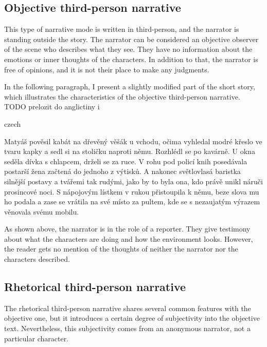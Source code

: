 \subsection{Objective third-person narrative}
This type of narrative mode is written in third-person, and the narrator is standing outside the story. The narrator can be considered an objective observer of the scene who describes what they see. They have no information about the emotions or inner thoughts of the characters. \cite{docekalova} In addition to that, the narrator is free of opinions, and it is not their place to make any judgments.

In the following paragraph, I present a slightly modified part of the short story, which illustrates the characteristics of the objective third-person narrative.
\newline
TODO prelozit do anglictiny i
\begin{otherlanguage*}{czech}
\begin{quoting}
Matyáš pověsil kabát na dřevěný věšák u vchodu, očima vyhledal modré křeslo ve tvaru kapky a sedl si na stoličku naproti němu. Rozhlédl se po kavárně. U okna seděla dívka s chlapcem, drželi se za ruce. V rohu pod policí knih posedávala postarší žena začtená do jednoho z výtisků. A nakonec světlovlasá baristka silnější postavy a tvářemi tak rudými, jako by to byla ona, kdo právě unikl náruči prosincové noci. S nápojovým lístkem v rukou přistoupila k němu, beze slova mu ho podala a zase se vrátila na své místo za pultem, kde se s nezaujatým výrazem věnovala svému mobilu.
\newline
\end{quoting}
\end{otherlanguage*}

As shown above, the narrator is in the role of a reporter. They give testimony about what the characters are doing and how the environment looks. However, the reader gets no mention of the thoughts of neither the narrator nor the characters described.

\subsection{Rhetorical third-person narrative}
The rhetorical third-person narrative shares several common features with the objective one, but it introduces a certain degree of subjectivity into the objective text. Nevertheless, this subjectivity comes from an anonymous narrator, not a particular character. \cite{dolezel-narativni-zpusoby}
\newline

